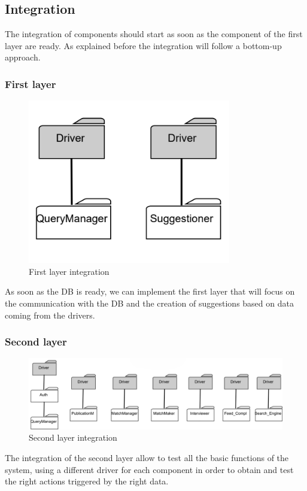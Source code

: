 \documentclass{article}
\begin{document}
\subsection{Integration}
The integration of components should start as soon as the component of the first layer are ready. As explained before the integration
will follow a bottom-up approach.\newline

\subsubsection{First layer}
\begin{figure}[H]
    \centering
    \includegraphics[width=0.5\linewidth]{Integration/firstLayerIntegration.png}
    \caption{First layer integration}
    \label{fig:enter-label}
\end{figure}
As soon as the DB is ready, we can implement the first layer that will focus on the communication with the DB and the creation of suggestions based on data coming from the drivers.

\subsubsection{Second layer}
\begin{figure}[H]
    \centering
    \includegraphics[width=0.5\linewidth]{Integration/secondLayerIntegration.png}
    \caption{Second layer integration}
    \label{fig:enter-label}
\end{figure}
The integration of the second layer allow to test all the basic functions of the system, using a different driver for each component in order to obtain and test the right actions triggered by the right data.
\end{document}
